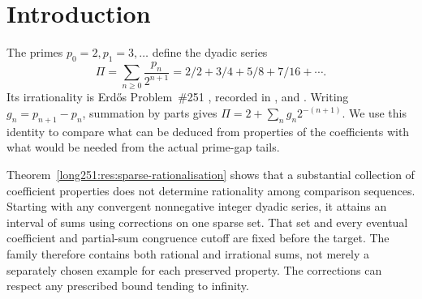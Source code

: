 \maketitle
\noteprovenance

\begin{abstract}
A sparse perturbation theorem shows that specified coefficient congruences
and asymptotic block statistics are compatible with both rational and irrational
dyadic sums.  For any convergent series with nonnegative integer
coefficients, one set of upper Banach density zero supports nonnegative
corrections attaining an interval of sums.  Any prescribed bound tending
to infinity is eventually respected; coefficient and partial-sum residues
are eventually preserved, with cutoffs independent of the target.
Fixed ordinary pair totals protect the congruences; growing digit ranges
keep the later weighted choices large enough to fill the interval.
Applied to prime gaps with correction bound $\log(n+3)$, the theorem
preserves cumulative growth $n\log n$ and gives vanishing total variation
error for blocks of length $o(\log\log X)$ sampled on $[X,2X)$, without
ensuring primality.
For the actual series, integral shifts of the complete tails characterise
rationality.  We give sufficient conditions, counterexamples to weaker
coefficient conditions, and integer certificates excluding denominators
below $2^{40062}>10^{12059}$.  Irrationality remains unresolved.
\end{abstract}

\section{Introduction}\label{long251:sec:problem}
The primes $p_0=2,p_1=3,\ldots$ define the dyadic series
\[
 \Pi=\sum_{n\ge0}\frac{p_n}{2^{n+1}}
     =2/2+3/4+5/8+7/16+\cdots.
\]
Its irrationality is Erd\H{o}s Problem~\#251 \cite{erdosproblems},
recorded in \cite[p.~94]{erdos1958}, \cite[p.~62]{erdosgraham1980} and
\cite[p.~103]{erdos1988}.  Writing $g_n=p_{n+1}-p_n$, summation by
parts gives $\Pi=2+\sum_ng_n2^{-(n+1)}$.  We use this identity to
compare what can be deduced from properties of the coefficients with
what would be needed from the actual prime-gap tails.

Theorem~\ref{long251:res:sparse-rationalisation} shows that a substantial
collection of coefficient properties does not determine rationality among
comparison sequences.  Starting with any convergent nonnegative integer
dyadic series, it attains an interval of sums using corrections on one
sparse set.  That set and every eventual coefficient and partial-sum
congruence cutoff are fixed before the target.  The family therefore
contains both rational and irrational sums, not merely a separately
chosen example for each preserved property.  The corrections can
respect any prescribed bound tending to infinity.


